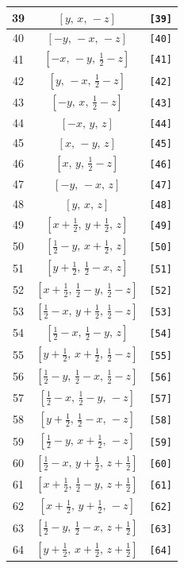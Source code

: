 \documentclass[fleqn,8pt]{jsarticle}
\begin{document}
\begin{longtable}{ccc}
39 & $\left[ y,\, x,\, - z \right]$ & {\tt [39]} \\ \hline
40 & $\left[ - y,\, - x,\, - z \right]$ & {\tt [40]} \\ \hline
41 & $\left[ - x,\, - y,\, \frac{1}{2} - z \right]$ & {\tt [41]} \\ \hline
42 & $\left[ y,\, - x,\, \frac{1}{2} - z \right]$ & {\tt [42]} \\ \hline
43 & $\left[ - y,\, x,\, \frac{1}{2} - z \right]$ & {\tt [43]} \\ \hline
44 & $\left[ - x,\, y,\, z \right]$ & {\tt [44]} \\ \hline
45 & $\left[ x,\, - y,\, z \right]$ & {\tt [45]} \\ \hline
46 & $\left[ x,\, y,\, \frac{1}{2} - z \right]$ & {\tt [46]} \\ \hline
47 & $\left[ - y,\, - x,\, z \right]$ & {\tt [47]} \\ \hline
48 & $\left[ y,\, x,\, z \right]$ & {\tt [48]} \\ \hline
49 & $\left[ x + \frac{1}{2},\, y + \frac{1}{2},\, z \right]$ & {\tt [49]} \\ \hline
50 & $\left[ \frac{1}{2} - y,\, x + \frac{1}{2},\, z \right]$ & {\tt [50]} \\ \hline
51 & $\left[ y + \frac{1}{2},\, \frac{1}{2} - x,\, z \right]$ & {\tt [51]} \\ \hline
52 & $\left[ x + \frac{1}{2},\, \frac{1}{2} - y,\, \frac{1}{2} - z \right]$ & {\tt [52]} \\ \hline
53 & $\left[ \frac{1}{2} - x,\, y + \frac{1}{2},\, \frac{1}{2} - z \right]$ & {\tt [53]} \\ \hline
54 & $\left[ \frac{1}{2} - x,\, \frac{1}{2} - y,\, z \right]$ & {\tt [54]} \\ \hline
55 & $\left[ y + \frac{1}{2},\, x + \frac{1}{2},\, \frac{1}{2} - z \right]$ & {\tt [55]} \\ \hline
56 & $\left[ \frac{1}{2} - y,\, \frac{1}{2} - x,\, \frac{1}{2} - z \right]$ & {\tt [56]} \\ \hline
57 & $\left[ \frac{1}{2} - x,\, \frac{1}{2} - y,\, - z \right]$ & {\tt [57]} \\ \hline
58 & $\left[ y + \frac{1}{2},\, \frac{1}{2} - x,\, - z \right]$ & {\tt [58]} \\ \hline
59 & $\left[ \frac{1}{2} - y,\, x + \frac{1}{2},\, - z \right]$ & {\tt [59]} \\ \hline
60 & $\left[ \frac{1}{2} - x,\, y + \frac{1}{2},\, z + \frac{1}{2} \right]$ & {\tt [60]} \\ \hline
61 & $\left[ x + \frac{1}{2},\, \frac{1}{2} - y,\, z + \frac{1}{2} \right]$ & {\tt [61]} \\ \hline
62 & $\left[ x + \frac{1}{2},\, y + \frac{1}{2},\, - z \right]$ & {\tt [62]} \\ \hline
63 & $\left[ \frac{1}{2} - y,\, \frac{1}{2} - x,\, z + \frac{1}{2} \right]$ & {\tt [63]} \\ \hline
64 & $\left[ y + \frac{1}{2},\, x + \frac{1}{2},\, z + \frac{1}{2} \right]$ & {\tt [64]} \\
\end{longtable}
\end{document}
